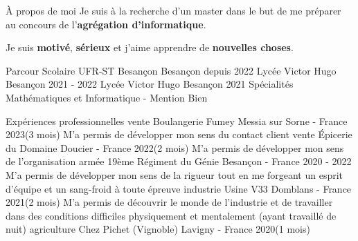 \documentclass{article}
\begin{document}
\begin{minipage}{\textwidth}
{\begin{bentosection}{À propos de moi}
            Je suis à la recherche d'un master dans le but de me préparer
            au concours de l'\textbf{agrégation d'informatique}. 

            Je suis \textbf{motivé}, \textbf{sérieux} et j'aime apprendre de \textbf{nouvelles choses}.
        \end{bentosection}
        \begin{bentosection}{Parcour Scolaire}
            {UFR-ST Besançon}
            {Besançon}
            {depuis 2022}
            {}
            {Lycée Victor Hugo}
            {Besançon}
            {2021 - 2022}
            {}
            {Lycée Victor Hugo}
            {Besançon}
            {2021}
            {Spécialités Mathématiques et Informatique - Mention Bien}
        \end{bentosection}
        \begin{bentosection}{Expériences professionnelles}
            {vente}
            {Boulangerie Fumey}
            {Messia sur Sorne - France}
            {2023(3 mois)}
            {M'a permis de développer mon sens du contact client}
            {vente}
            {Épicerie du Domaine}
            {Doucier - France}
            {2022(2 mois)}
            {M'a permis de développer mon sens de l'organisation}
            {armée}
            {19ème Régiment du Génie}
            {Besançon - France}
            {2020 - 2022}
            {M'a permis de développer mon sens de la rigueur tout en me forgeant 
            un esprit d'équipe et un sang-froid à toute épreuve}
            {industrie}
            {Usine V33}
            {Domblans - France}
            {2021(2 mois)}
            {M'a permis de découvrir le monde de l'industrie et de travailler dans 
            des conditions difficiles physiquement et mentalement (ayant travaillé de nuit)}
            {agriculture}
            {Chez Pichet (Vignoble)}
            {Lavigny - France}
            {2020(1 mois)}
            {}
        \end{bentosection}
    }
\end{minipage}
\end{document}
